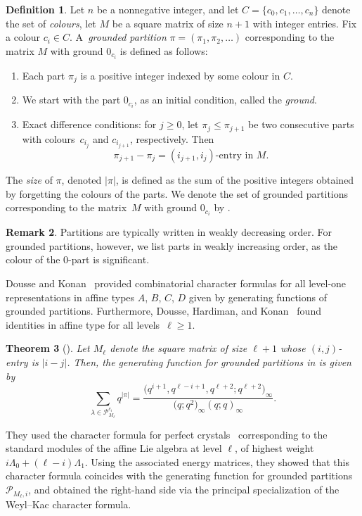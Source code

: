 \documentclass[pdftex]{sigma}
\numberwithin{equation}{section}
\newtheorem{Theorem}{Theorem}[section]
\theoremstyle{definition}
\newtheorem{Definition}[Theorem]{Definition}
\newtheorem{Remark}[Theorem]{Remark}
\begin{document}
\begin{Definition}\label{def:grounded_partitions}
 Let $ n $ be a nonnegative integer, and let
 $C=\{c_0,c_1,\ldots,c_n\}$ denote the set of \emph{colours}, let $M$ be a square matrix of size $n+1$ with integer entries.
 Fix a colour $c_i\in C$. A~\emph{grounded partition}
 $ \pi = (\pi_1, \pi_2, \dots ) $ corresponding to the
 matrix $M$ with ground $0_{c_i}$ is defined as follows:
\begin{enumerate}[label=(\roman*)]\itemsep=0pt
\item Each part $ \pi_j $ is a positive integer indexed by some colour in $C$.
\item We start with the part $0_{c_i}$, as an initial condition,
 called the \emph{ground}.
\item Exact difference conditions: for $ j \geq 0 $, let
 $\pi_{j}\leq\pi_{j+1}$ be two consecutive parts with
 colours~$c_{i_j}$ and $c_{i_{j+1}}$, respectively. Then
 \[
 \pi_{j+1}-\pi_{j} = (i_{j+1},i_j)\text{-entry in } M.
 \]
\end{enumerate}
The \emph{size} of $\pi$, denoted $|\pi|$, is defined as the
sum of the positive integers obtained by forgetting the colours of the parts. We denote the set of grounded partitions corresponding to the matrix~$M$ with ground $0_{c_i}$ by .
\end{Definition}

\begin{Remark}
Partitions are typically written in weakly decreasing order. For
grounded partitions, however, we list parts in weakly increasing
order, as the colour of the $ 0 $-part is significant.
\end{Remark}

Dousse and Konan~\cite{DK19b,DK22, DK22c} provided combinatorial character formulas for all level-one representations in affine types $A$, $B$, $C$, $D$ given by generating functions of grounded partitions. Furthermore, Dousse, Hardiman, and Konan~\cite{DHK25} found identities in affine type  for all levels~${\ell \geq 1}$.

\begin{Theorem}[{\cite[Theorem~1.6]{DHK25}}]%
Let $M_\ell$ denote the square matrix of size $\ell+1$ whose
$(i,j)$-entry is $|i-j|$. Then, the generating function for grounded partitions in
 is given by
\[
 \sum_{\lambda \in \mathcal{P}_{M_\ell}^{c_i}} q^{|\pi|} = \frac{\bigl(q^{i+1}, q^{\ell-i+1}, q^{\ell+2}; q^{\ell+2}\bigr)_\infty}{\bigl(q;q^2\bigr)_\infty (q;q)_\infty}.
\]
\end{Theorem}
They used the character formula for perfect crystals~\cite{KMN92} corresponding to
the standard modules of the affine Lie algebra  at
level $ \ell $, of highest weight
$ i \Lambda_0 + (\ell-i) \Lambda_1 $. Using the associated energy
matrices, they showed that this character formula coincides with the
generating function for grounded partitions $ \mathcal{P}_{M_\ell, i} $,
and obtained the right-hand side via the principal specialization of
the Weyl--Kac character formula.
\end{document}

